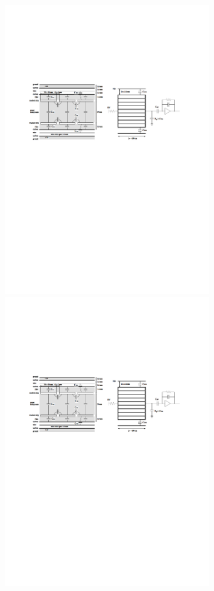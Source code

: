 \begin{figure}[H]
		\begin{minipage}{0.49\hsize}
		\centering
        \includegraphics[width=0.8\textwidth,page=3]{img/pdf/ASD.pdf}
        \subcaption{}
        \end{minipage}
        \begin{minipage}{0.49\hsize}
        \centering
        \includegraphics[width=0.8\textwidth,page=4]{img/pdf/ASD.pdf}

\end{minipage}
\end{figure}
